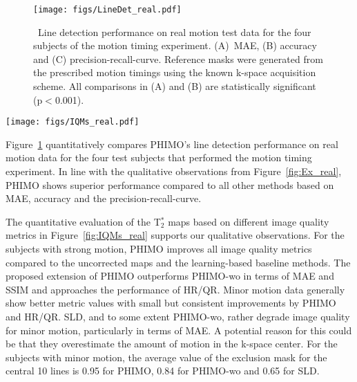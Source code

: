 \documentclass[AMA,STIX2COL]{MRM}
\newcommand{\tstar}[1]{{T$_2^*$}}
\begin{document}
%
\begin{figure}
\centerline{\texttt{[image: figs/LineDet\_real.pdf]}}
\caption{\ Line detection performance on real motion test data for the four subjects of the motion timing experiment. 
(A)~MAE, (B) accuracy and (C) precision-recall-curve.
Reference masks were generated from the prescribed motion timings using the known k-space acquisition scheme.
All comparisons in (A) and (B) are statistically significant (p$<$0.001).}\label{fig:LD_real}
\end{figure}
%
%
\begin{figure*}
\centerline{\texttt{[image: figs/IQMs\_real.pdf]}}
\caption{\ Quantitative evaluation of \tstar{} maps for real motion test data. 
Image quality metrics MAE, SSIM, FSIM and LPIPS relative to the motion-free \tstar{} map for four subjects with minor motion (A) and five subjects with strong motion (B). The proposed PHIMO improves compared to the uncorrected \tstar{} map and outperforms PHIMO-wo as well as the learning-based baselines (ORBA and SLD). Gray brackets indicate comparisons with no statistical significance (p$>$0.001).}\label{fig:IQMs_real}
\end{figure*}
%
Figure~\ref{fig:LD_real} quantitatively compares PHIMO's line detection performance on real motion data for the four test subjects that performed the motion timing experiment. In line with the qualitative observations from Figure~\ref{fig:Ex_real}, PHIMO shows superior performance compared to all other methods based on MAE, accuracy and the precision-recall-curve.


The quantitative evaluation of the \tstar{} maps based on different image quality metrics in Figure~\ref{fig:IQMs_real} supports our qualitative observations. For the subjects with strong motion, PHIMO improves all image quality metrics compared to the uncorrected maps and the learning-based baseline methods. The proposed extension of PHIMO outperforms PHIMO-wo in terms of MAE and SSIM and approaches the performance of HR/QR. Minor motion data generally show better metric values with small but consistent improvements by PHIMO and HR/QR. SLD, and to some extent \mbox{PHIMO-wo}, rather degrade image quality for minor motion, particularly in terms of MAE. A potential reason for this could be that they overestimate the amount of motion in the \mbox{k-space} center. For the subjects with minor motion, the average value of the exclusion mask for the central 10 lines is 0.95 for PHIMO, 0.84 for PHIMO-wo and 0.65 for SLD.
\end{document}
